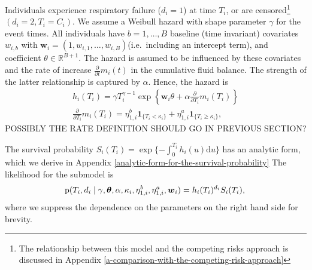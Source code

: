 \documentclass[
  10pt,
  a4paper,
]{article}
\newcommand{\pd}{\text{p}}
\begin{document}
Individuals experience respiratory failure (\(d_{i} = 1\)) at time
\(T_{i}\), or are censored\footnote{The relationship between this model
  and the competing risks approach is discussed in Appendix
  \ref{a-comparison-with-the-competing-risk-approach}}
\((d_{i} = 2, T_{i} = C_{i})\). We assume a Weibull hazard with shape
parameter \(\gamma\) for the event times. All individuals have
\(b = 1, \ldots, B\) baseline (time invariant) covariates \(w_{i, b}\)
with
\(\boldsymbol{w}_{i} = (1, w_{i, 1}, \ldots, w_{i, B})\)(i.e.~including
an intercept term), and coefficient \(\theta \in \mathbb{R}^{B + 1}\).
The hazard is assumed to be influenced by these covariates and the rate
of increase \(\frac{\partial}{\partial t} m_{i}(t)\) in the cumulative
fluid balance. The strength of the latter relationship is captured by
\(\alpha\). Hence, the hazard is \begin{gather}
  h_{i}(T_{i}) = \gamma T_{i}^{\gamma - 1} \exp\left\{\boldsymbol{w}_{i}\theta + \alpha \frac{\partial}{\partial T_{i}} m_{i}(T_{i})\right\} \\
  \frac{\partial}{\partial T_{i}} m_{i}(T_{i}) = \eta^{b}_{1, i}\boldsymbol{1}_{\{T_{i} < \kappa_{i}\}} + \eta^{a}_{1, i}\boldsymbol{1}_{\{T_{i} \geq \kappa_{i}\}},
\end{gather} POSSIBLY THE RATE DEFINITION SHOULD GO IN PREVIOUS SECTION?

The survival probability
\(S_{i}(T_{i}) = \exp\{-\int_{0}^{T_{i}}h_{i}(u)\text{d}u\}\) has an
analytic form, which we derive in Appendix
\ref{analytic-form-for-the-survival-probability} The likelihood for the
submodel is \begin{equation}
  \pd(T_{i}, d_{i} \mid \gamma, \boldsymbol{\theta}, \alpha, \kappa_{i}, \eta_{1, i}^{b}, \eta_{1, i}^{a}, \boldsymbol{w}_{i}) = h_{i}(T_{i})^{d_{i}} S_{i}(T_{i}), \\
\end{equation} where we suppress the dependence on the parameters on the
right hand side for brevity.
\end{document}
